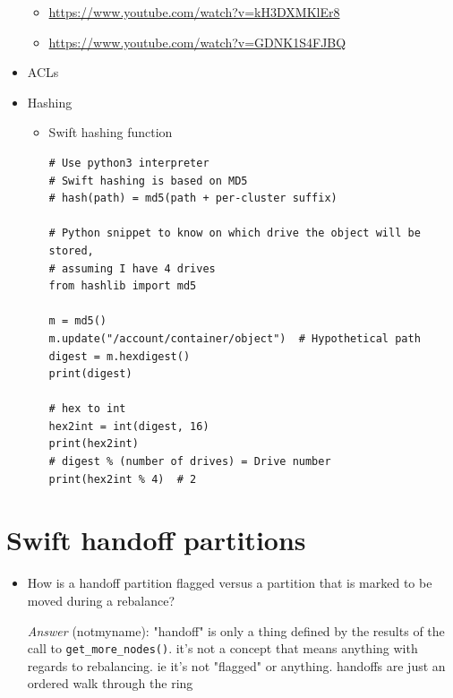 \documentclass{article}
\begin{document}
\begin{itemize}
\begin{itemize}
\item \url{https://www.youtube.com/watch?v=kH3DXMKlEr8}
\item \url{https://www.youtube.com/watch?v=GDNK1S4FJBQ}
\end{itemize}

\item ACLs

\item Hashing
\begin{itemize}
\item Swift hashing function
\begin{verbatim}
# Use python3 interpreter
# Swift hashing is based on MD5
# hash(path) = md5(path + per-cluster suffix)

# Python snippet to know on which drive the object will be stored,
# assuming I have 4 drives
from hashlib import md5

m = md5()
m.update("/account/container/object")  # Hypothetical path
digest = m.hexdigest()
print(digest)

# hex to int
hex2int = int(digest, 16)
print(hex2int)
# digest % (number of drives) = Drive number
print(hex2int % 4)  # 2
\end{verbatim}
\end{itemize}
\end{itemize}

\section{Swift handoff partitions}
\label{sec:org665de3e}
\begin{itemize}
\item How is a handoff partition flagged versus a partition that is
marked to be moved during a rebalance?

\emph{Answer} (notmyname): "handoff" is only a thing defined by the
results of the call to \texttt{get\_more\_nodes()}. it's not a concept
that means anything with regards to rebalancing. ie it's not
"flagged" or anything. handoffs are just an ordered walk through
the ring
\end{itemize}
\end{document}

